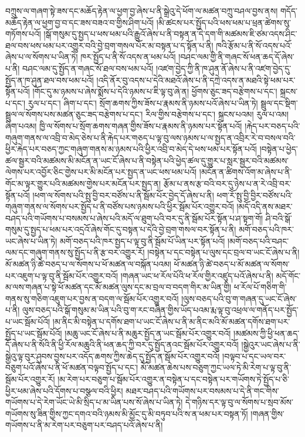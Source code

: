 བཀྲུས་ལ་གཞག་སྟེ་ཟས་དང་མཆོད་རྟེན་ལ་ཕྱག་བྱ་ཞེས་པ་ནི་སྒྲེའུ་དེ་ཕོག་ལ་མཚན་བཀྲུ་བཤལ་བྱས་ནས། གདོད་མཆོད་རྟེན་ལ་ཕྱག་བྱ་བ་དང་ཟས་བཟའ་བ་གྱིས་ཤིག་པའོ། །མི་ཚངས་པར་སྤྱོད་པའི་ཕས་ཕམ་པ་ཕྲན་ཚེགས་སུ་གཏོགས་པའོ། །སྒོ་གསུམ་དུ་སྤྱད་པ་ཕས་ཕམ་པའི་རྒྱུའོ་ཞེས་པ་ནི་བསྟན་ན་དེ་དག་གི་མཚམས་ཇི་ཙམ་འདས་ཤིང་ཐལ་བས་ཕས་ཕམ་པར་འགྱུར་བའི་བྱེ་བྲག་གསལ་པོར་མ་བསྟན་པ་ད་སྟོན་པ་ནི། ཁའི་རྩོམ་པ་ནི་སོ་འདས་པའོ་ཞེས་པ་ལ་སོགས་པ་ཡིན་ཏེ། ཁར་སྤྱོད་པ་ནི་སོ་འདས་ན་ཕམ་པའོ། །བཤང་ལམ་གྱི་ནི་གཞང་སོ་ཕན་ཆད་དོ་ཞེས་པ་ནི། བཤང་ལམ་དུ་སྤྱོད་ན་གཞང་སོ་ཐལ་བས་ཕམ་པའོ། །འཛག་བྱེད་ཀྱི་ནི་ཁ་ཤུན་ནོ་ཞེས་པ་ནི་འཛག་བྱེད་དུ་སྤྱོད་ན་ཁ་ཤུན་ཐལ་བས་ཕམ་པའོ། །འདི་ནོར་བུ་འདས་པ་དེའི་མཐའོ་ཞེས་པ་ནི་དཀྲེ་འདས་ན་མཐའི་སྟེ་ཕམ་པར་སྟོན་པའོ། །གོང་དུ་མ་ཉམས་པ་ཞེས་སྨོས་པ་དེའི་ཉམས་པ་ཇི་ལྟ་བུ་ཞེ་ན། ཕྱོགས་ཅུང་ཟད་བརྩེགས་པ་དང་། སྐྲངས་པ་དང་། རུལ་པ་དང་། ཞིག་པ་དང་། སྲོག་ཆགས་ཀྱིས་ཟོས་པ་རྣམས་ནི་ཉམས་པའོ་ཞེས་པ་ཡིན་ཏེ། སྦྲུལ་དང་སྡིག་སྦྲུལ་ལ་སོགས་པས་མཚན་ཅུང་ཟད་བརྩེགས་པ་དང་། རིལ་གྱིས་བརྩེགས་པ་དང་། སྐྲངས་པའམ། རུལ་པ་འམ། ཞིག་པའམ། ཁྱི་ལ་སོགས་པ་སྲོག་ཆགས་གཞན་གྱིས་ཟོས་པ་རྣམས་ནི་ཉམས་པར་སྟོན་པའོ། །རྐེད་པར་བཅད་པའི་གཞུག་གནས་ལ་འབྲི་བ་མེད་ཅེས་པ་ནི་རྐེད་པར་གཅད་པ་ལྟ་བུ་ལས་ཉམས་པ་ལ་སྤྱད་ན་འབྲིར་རེ་བ་བསལ་བའི་ཕྱིར་རྐེད་པར་བཅད་ཀྱང་གཞུག་གནས་མ་ཉམས་པའི་ཕྱིར་འབྲི་བ་མེད་དེ་ཕས་ཕམ་པར་སྟོན་པའོ། །བསྟེན་པ་ཕྱེད་ཚལ་སྦྱར་བའི་མཚམས་མི་མངོན་ན་ཡང་ངོ་ཞེས་པ་ནི་བསྟེན་པའི་ཕྱེད་ཚལ་དུ་གྱུར་པ་སླར་སྦྱར་བའི་མཚམས་ལེགས་པར་འབྱོར་ཅིང་གྱེས་པར་མི་མངོན་པར་སྤྱད་ན་ཡང་ཕས་ཕམ་པའོ། །མངོན་ན་ཚིགས་འོག་མ་ཞེས་པ་ནི་གོང་མ་ལྟར་གྱུར་པའི་མཚམས་གྱེས་པར་མངོན་པར་སྤྱད་ན། རྩོམ་པ་ནས་རྩ་བའི་བར་དུ་ཉེས་པ་ན་རེ་འབྲི་བར་སྟོན་པའོ། །ཕག་ལ་སོགས་པའི་སྤུ་བྱི་བར་བཙོས་པ་ནི་སྦོམ་པོར་བྱེད་དོ་ཞེས་པ་ནི། ཕག་རོ་སྤུ་བྱི་བྱིར་བཙོས་པའི་གཞུག་གནས་ལ་སོགས་པར་སྤྱོད་པ་ནི་བཙོས་པས་ཉམས་པའི་ཕྱིར་སྦོམ་པོར་འགྱུར་བའོ། །མདོ་འདི་ནས་མཐར་བཤད་པའི་གཡོགས་པ་བསམས་པ་ཞེས་པའི་མདོ་ལ་ཐུག་པའི་བར་དུ་ནི་སྦོམ་པོར་སྟོན་པ་ཤ་སྟག་གོ། ཤི་བའི་སྒོ་གསུམ་དུ་སྤྱད་པ་ཕམ་པར་འདྲའོ་ཞེས་གོང་དུ་བསྟན་པ་དེའི་བྱེ་བྲག་གསལ་བར་སྟོན་པ་ནི། མགོ་བཅད་པའི་ཁར་ཡང་ཞེས་པ་ཡིན་ཏེ། མགོ་བཅད་པའི་ཁར་སྤྱད་པ་ལྟ་བུ་ནི་སྦོམ་པོ་ཡིན་པར་སྟོན་པའོ། །མགོ་བཅད་པའི་བཤང་ལམ་དང་གཞུག་གནས་སུ་སྤྱོད་པ་ནི་རྩ་བར་འགྱུར་རོ། །བསྟེན་པ་དང་བསྟེན་པ་ལུས་དང་བྲལ་བ་ཡང་ངོ་ཞེས་པ་ནི། མོ་མཚན་ཉི་ཚེ་བཅད་པ་ལ་སོགས་པ་ཕོ་མཚན་ལ་བསྐོན་པའམ། ཕོ་མཚན་ཉི་ཚེ་བཅད་པ་མོ་མཚན་ལ་སོགས་པར་འཇུག་པ་ལྟ་བུ་ནི་སྦོམ་པོར་འགྱུར་བའོ། །གཞན་ཡང་ཕ་རོལ་པོའི་ཕ་རོལ་གྱིར་འཛུད་པའོ་ཞེས་པ་ནི། མདོ་གོང་མ་ལས་གཞན་པ་སྟེ་ཕོ་མཚན་དང་མོ་མཚན་ལུས་དང་མ་བྲལ་བ་བདག་གིར་མ་ཡིན་གྱི། ཕ་རོལ་པོ་གཅིག་གི་གནས་སུ་གཅིག་འཇུག་པར་བྱས་ན་བདག་ལ་སྦོམ་པོར་འགྱུར་བའོ། །ལུས་བཅད་པའི་བུ་ག་གཞན་དུ་ཡང་ངོ་ཞེས་པ་ནི། ལུས་བཅད་པའི་སྒོ་གསུམ་མ་ཡིན་པའི་བུ་ག་རང་བཞིན་གྱིས་ཡོད་པའམ་རྨ་ལྟ་བུ་འཕྲལ་ལ་གནོད་པར་སྤྱོད་པ་ཡང་སྦོམ་པོའོ། །མ་ནིང་མི་བསྟེན་པ་དགོས་ཐག་པ་ཡང་ངོ་ཞེས་པ་ནི་མ་ནིང་མའི་མོ་མཚན་དགོས་ཐག་པར་སྤྱོད་པ་ཡང་སྦོམ་པོའོ། །མཆུ་ཡང་ངོ་ཞེས་པ་ནི་མཆུར་སྤྱོད་ན་ཡང་སྦོམ་པོར་འགྱུར་བའོ། །མཚམས་ཀྱི་ཕྱི་ཕན་ཆད་དོ་ཞེས་པ་ནི་སོའི་ནི་ཕྱི་རོལ་མཆུའི་ནི་ཕན་ཆད་ཀྱི་བར་དུ་སྤྱོད་ནའང་སྦོམ་པོར་འགྱུར་བའོ། །སྒྱེའུར་ཡང་ཞེས་པ་ནི་སྒྱེའུ་ལྟ་བུར་ཤུབས་བྱས་པར་འདོད་ཆགས་ཀྱིས་ཆེད་དུ་སྤྱོད་ན་སྦོམ་པོར་འགྱུར་བའོ། །བལྟབ་པ་དང་ཡལ་བར་བཅུག་པའོ་ཞེས་པ་ནི་ཕོ་མཚན་བལྟབ་སྤྱོད་པ་དང་། མོ་མཚན་ཆེས་པས་བཅུག་ཀྱང་ཡལ་ཏེ་མི་རེག་པ་ལྟ་བུ་ནི་སྦོམ་པོར་འགྱུར་རོ། །མ་རེག་པར་བཅུག་པ་སྦོམ་པོར་འགྱུར་ན་བསྟེན་པ་དང་བསྟེན་པར་གཡོགས་ཏེ་སྤྱོད་པ་ཅི་ཕྱིར་ཕམ་ཞེས་པའི་དོགས་པ་བསྩལ་བའི་ཕྱིར། མཐར་བཤད་པའི་གཡོགས་པར་བསམས་པ་དེ་ནི་གང་གིས་གཡོགས་པ་དེ་རེག་ཡོང་ཡེ་མི་སྲིད་པ་མ་ཡིན་པས་སོ་ཞེས་པ་ཡིན་ཏེ། དེ་གཉིས་དར་ལྟ་བུ་ལ་སོགས་པ་སྲབ་མོས་གཡོགས་སུ་ཟིན་གྱིས་ཀྱང་དགའ་བའི་ཉམས་མི་མྱོང་དུ་མི་བཏུབ་པའི་ས་ན་ཕམ་པར་བསྟན་ཏོ། །གཞན་གྱིས་གཡོགས་པ་ནི་མ་རེག་པར་བཅུག་པར་བཤད་པའོ་ཞེས་པ་ནི། 